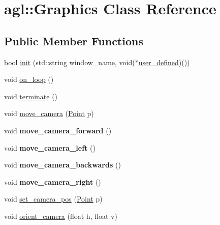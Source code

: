 \hypertarget{classagl_1_1Graphics}{}\section{agl\+::Graphics Class Reference}
\label{classagl_1_1Graphics}
\subsection*{Public Member Functions}
\begin{DoxyCompactItemize}
\item 
bool \mbox{\hyperlink{classagl_1_1Graphics_aee3cc5d72b595b9b9cd87c6e0af9c65b}{init}} (std\+::string window\+\_\+name, void($\ast$\mbox{\hyperlink{classagl_1_1Graphics_aaf660bd9fd1b06652b05f7a7ef3e6fcb}{user\+\_\+defined}})())
\item 
void \mbox{\hyperlink{classagl_1_1Graphics_abfecb1bbd932fb29b9d92a08da02684a}{on\+\_\+loop}} ()
\item 
void \mbox{\hyperlink{classagl_1_1Graphics_a2c277530c365b51dd3516f6feb4b767b}{terminate}} ()
\item 
void \mbox{\hyperlink{classagl_1_1Graphics_acfc64f7e1033725ebda79f176d462dca}{move\+\_\+camera}} (\mbox{\hyperlink{classagl_1_1Point}{Point}} p)
\item 
\mbox{\label{classagl_1_1Graphics_af7ccf51c641ee245cd8f7796a9b11751}} 
void {\bfseries move\+\_\+camera\+\_\+forward} ()
\item 
\mbox{\label{classagl_1_1Graphics_a83d682511effbd389f111cf5343444c7}} 
void {\bfseries move\+\_\+camera\+\_\+left} ()
\item 
\mbox{\label{classagl_1_1Graphics_a3980ac9cfd5ba883ee32e3b8865d1d6f}} 
void {\bfseries move\+\_\+camera\+\_\+backwards} ()
\item 
\mbox{\label{classagl_1_1Graphics_a427d8f2dcc3744d6174168cfb41e032b}} 
void {\bfseries move\+\_\+camera\+\_\+right} ()
\item 
void \mbox{\hyperlink{classagl_1_1Graphics_ac6b1de3994149a36a53095b9192458a3}{set\+\_\+camera\+\_\+pos}} (\mbox{\hyperlink{classagl_1_1Point}{Point}} p)
\item 
void \mbox{\hyperlink{classagl_1_1Graphics_ae44f29a47ac84c0ab49813dbc0585e46}{orient\+\_\+camera}} (float h, float v)

\end{DoxyCompactItemize}
